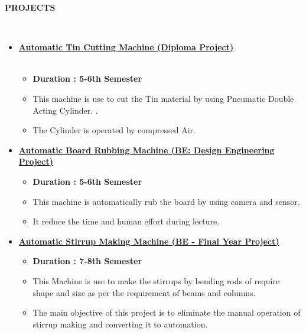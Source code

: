 \documentclass[a4paper,10pt]{article}
\newcommand{\isep}{-2 pt}
\newcommand{\lsep}{-0.5cm}
\newcommand{\resheading}[1]{{\small \colorbox{mygrey}{\begin{minipage}{0.975\textwidth}{\textbf{#1 \vphantom{p\^{E}}}}\end{minipage}}}}
\begin{document}
\hspace{1 cm}
\resheading{\textbf{PROJECTS} }\\[\lsep]
\begin{itemize}

\item \underline {\textbf{Automatic Tin Cutting Machine 
 (Diploma Project)}} \\ \\[-0.6cm] 
	\begin{itemize}\itemsep \isep
	\item \textbf{Duration : 5-6th Semester}  
	\item This machine is use to cut the Tin material by using Pneumatic Double Acting Cylinder.
.
	\item The Cylinder is operated by compressed Air.

	\end{itemize}
	
	\item \underline{ \textbf{Automatic Board Rubbing Machine (BE: Design Engineering Project)} } \\
	\begin{itemize}
	    \item \textbf{Duration : 5-6th Semester}
	    \item This machine is automatically rub the board by using camera and sensor.
	    \item It reduce the time and human effort during lecture.
	\end{itemize}
	
\item \underline{\textbf{Automatic Stirrup Making Machine
 (BE - Final Year Project) }} \\
	\begin{itemize}\itemsep \isep
	\item \textbf{Duration : 7-8th Semester} 
	\item This Machine is use to make the stirrups by bending rods of require shape and size as per the requirement of beams and columns.
	\item The main objective of this project is to eliminate the manual operation of stirrup making and converting it to automation.
	\end{itemize}
\end{itemize}
\end{document}
